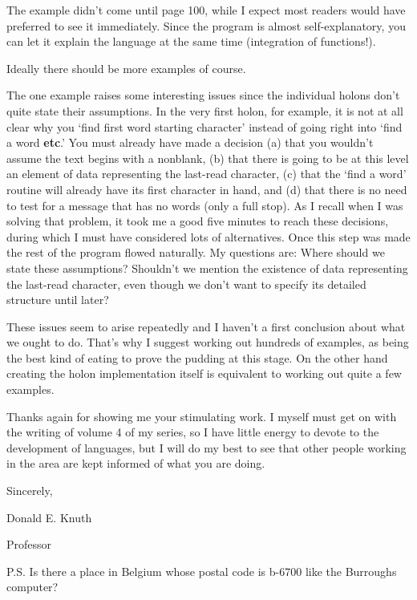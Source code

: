 \documentclass[openany,nobib]{tufte-book}
\newcommand{\kw}[1]{{\bf #1}}
\begin{document}
The example didn't come until page 100, while I expect most readers would have preferred to see it
immediately. Since the program is almost self-explanatory, you can let it
explain the language at the same time (integration of functions!).

Ideally there should be more examples of course.

The one example raises some interesting issues since the individual holons
don't quite state their assumptions. In the very first holon, for example, it
is not at all clear why you `find first word starting character' instead of
going right into `find a word \kw{etc}.' You must already have made a decision
(a) that you wouldn't assume the text begins with a nonblank, (b) that there is
going to be at this level an element of data representing the last-read
character, (c) that the `find a word' routine will already have its first
character in hand, and (d) that there is no need to test for a message that has
no words (only a full stop). As I recall when I was solving that problem, it
took me a good five minutes to reach these decisions, during which I must have
considered lots of alternatives. Once this step was made the rest of the
program flowed naturally. My questions are: Where should we state these
assumptions? Shouldn't we mention the existence of data representing the
last-read character, even though we don't want to specify its detailed
structure until later?

These issues seem to arise repeatedly and I haven't a first conclusion about
what we ought to do. That's why I suggest working out hundreds of examples, as
being the best kind of eating to prove the pudding at this stage. On the other
hand creating the holon implementation itself is equivalent to working out
quite a few examples.

Thanks again for showing me your stimulating work. I myself must get on with
the writing of volume 4 of my series, so I have little energy to devote to the
development of languages, but I will do my best to see that other people
working in the area are kept informed of what you are doing.

\medskip

\hfill Sincerely,

\bigskip

\hfill Donald E. Knuth

\hfill Professor

\bigskip
\bigskip

\noindent P.S. Is there a place in Belgium whose postal code is {\sc b}-6700
like the Burroughs computer?
\end{document}
